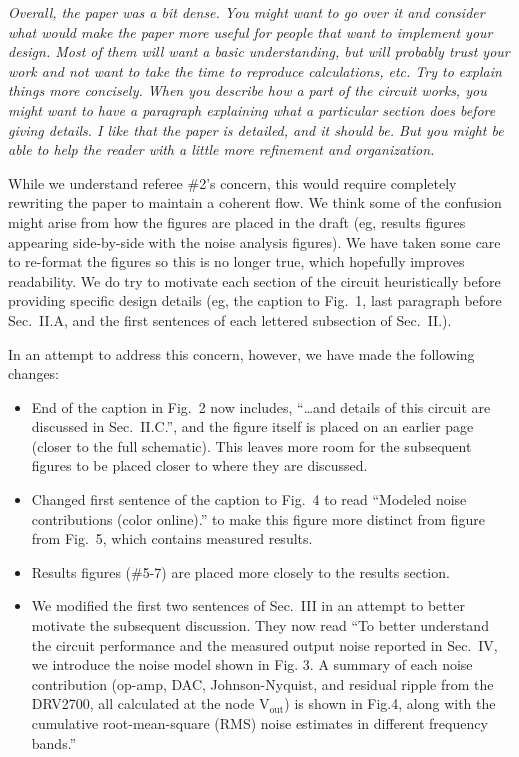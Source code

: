 \documentclass[12pt, oneside]{letter}   	%
\begin{document}
\textit{Overall, the paper was a bit dense. You might want to go over it and consider what would make the paper more useful for people that want to implement your design. Most of them will want a basic understanding, but will probably trust your work and not want to take the time to reproduce calculations, etc. Try to explain things more concisely. When you describe how a part of the circuit works, you might want to have a paragraph explaining what a particular section does before giving details. I like that the paper is detailed, and it should be. But you might be able to help the reader with a little more refinement and organization.}

While we understand referee \#2's concern, this would require completely rewriting the paper to maintain a coherent flow. We think some of the confusion might arise from how the figures are placed in the draft (eg, results figures appearing side-by-side with the noise analysis figures). We have taken some care to re-format the figures so this is no longer true, which hopefully improves readability. We do try to motivate each section of the circuit heuristically before providing specific design details (eg, the caption to Fig.~1, last paragraph before Sec.~II.A, and the first sentences of each lettered subsection of Sec.~II.).

In an attempt to address this concern, however, we have made the following changes:

\begin{itemize}
\item End of the caption in Fig.~2 now includes, ``\ldots and details of this circuit are discussed in Sec.~II.C.'', and the figure itself is placed on an earlier page (closer to the full schematic). This leaves more room for the subsequent figures to be placed closer to where they are discussed.
\item Changed first sentence of the caption to Fig.~4 to read ``Modeled noise contributions (color online).'' to make this figure more distinct from figure from Fig.~5, which contains measured results.
\item Results figures (\#5-7) are placed more closely to the results section.
\item We modified the first two sentences of Sec.~III in an attempt to better motivate the subsequent discussion. They now read ``To better understand the circuit performance and the measured output noise reported in Sec.~IV, we introduce the noise model shown in Fig. 3. A summary of each noise contribution (op-amp, DAC, Johnson-Nyquist, and residual ripple from the DRV2700, all calculated at the node $\text{V}_\text{out}$) is shown in Fig.4, along with the cumulative root-mean-square (RMS) noise estimates in different frequency bands.''
\end{itemize}
\end{document}
